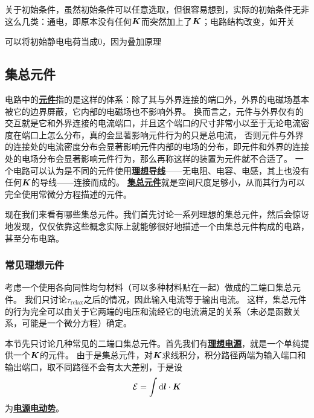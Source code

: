 \documentclass[UTF8, a4paper]{ctexart}
\newcommand*{\concept}[1]{\underline{\textbf{#1}}}
\begin{document}
关于初始条件，虽然初始条件可以任意选取，但很容易想到，实际的初始条件无非这么几类：通电，即原本没有任何$\vb*{K}$而突然加上了$\vb*{K}$；电路结构改变，如开关


可以将初始静电电荷当成0，因为叠加原理 %

\subsection{集总元件}

电路中的\concept{元件}指的是这样的体系：除了其与外界连接的端口外，外界的电磁场基本被它的边界屏蔽，它内部的电磁场也不影响外界。
换而言之，元件与外界仅有的交互就是它和外界连接的电流端口，并且这个端口的尺寸非常小以至于无论电流密度在端口上怎么分布，真的会显著影响元件行为的只是总电流，
否则元件与外界的连接处的电流密度分布会显著影响元件内部的电场的分布，即元件和外界的连接处的电场分布会显著影响元件行为，那么再称这样的装置为元件就不合适了。
一个电路可以认为是不同的元件使用\concept{理想导线}——无电阻、电容、电感，其上也没有任何$\vb*{K}$的导线——连接而成的。
\concept{集总元件}就是空间尺度足够小，从而其行为可以完全使用常微分方程描述的元件。

现在我们来看有哪些集总元件。我们首先讨论一系列理想的集总元件，然后会惊讶地发现，仅仅依靠这些概念实际上就能够很好地描述一个由集总元件构成的电路，甚至分布电路。

\subsubsection{常见理想元件}


考虑一个使用各向同性均匀材料（可以多种材料贴在一起）做成的二端口集总元件。
我们只讨论$\tau_\text{relax}$之后的情况，因此输入电流等于输出电流。
这样，集总元件的行为完全可以由关于它两端的电压和流经它的电流满足的关系（未必是函数关系，可能是一个微分方程）确定。

本节先只讨论几种常见的二端口集总元件。首先我们有\concept{理想电源}，就是一个单纯提供一个$\vb*{K}$的元件。
由于是集总元件，对$\vb*{K}$求线积分，积分路径两端为输入端口和输出端口，取不同路径不会有太大差别，于是设
\begin{equation}
    \mathcal{E} = \int \dd{\vb*{l}} \cdot \vb*{K}
\end{equation}
为\concept{电源电动势}。
\end{document}
